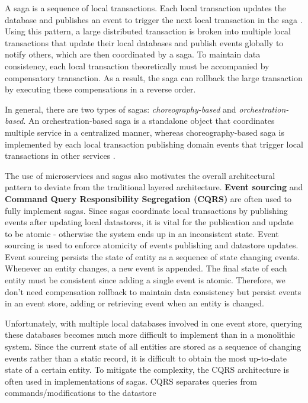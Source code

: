 A saga is a sequence of local transactions. Each local transaction updates the database and publishes an event to trigger the next local transaction in the saga \cite{richardson2014saga}. Using this pattern, a large distributed transaction is broken into multiple local transactions that update their local databases and publish events globally to notify others, which are then coordinated by a saga. To maintain data consistency, each local transaction theoretically must be accompanied by compensatory transaction. As a result, the saga can rollback the large transaction by executing these compensations in a reverse order.

In general, there are two types of sagas: \textit{choreography-based} and \textit{orchestration-based}. An orchestration-based saga is a standalone object that coordinates multiple service in a centralized manner, whereas choreography-based saga is implemented by each local transaction publishing domain events that trigger local transactions in other services \cite{richardson2014saga}.

The use of microservices and sagas also motivates the overall architectural pattern to deviate from the traditional layered architecture. \textbf{Event sourcing} and \textbf{Command Query Responsibility Segregation (CQRS)} are often used to fully implement sagas. Since sagas coordinate local transactions by publishing events after updating local datastores, it is vital for the publication and update to be atomic - otherwise the system ends up in an inconsistent state. Event sourcing is used to enforce atomicity of events publishing and datastore updates. Event sourcing persists the state of entity as a sequence of state changing events. Whenever an entity changes, a new event is appended. The final state of each entity must be consistent since adding a single event is atomic. Therefore, we don’t need compensation rollback to maintain data consistency but persist events in an event store, adding or retrieving event when an entity is changed.

Unfortunately, with multiple local databases involved in one event store, querying these databases becomes much more difficult to implement than in a monolithic system. Since the current state of all entities are stored as a sequence of changing events rather than a static record, it is difficult to obtain the most up-to-date state of a certain entity. To mitigate the complexity, the CQRS architecture is often used in implementations of sagas. CQRS separates queries from commands/modifications to the datastore
